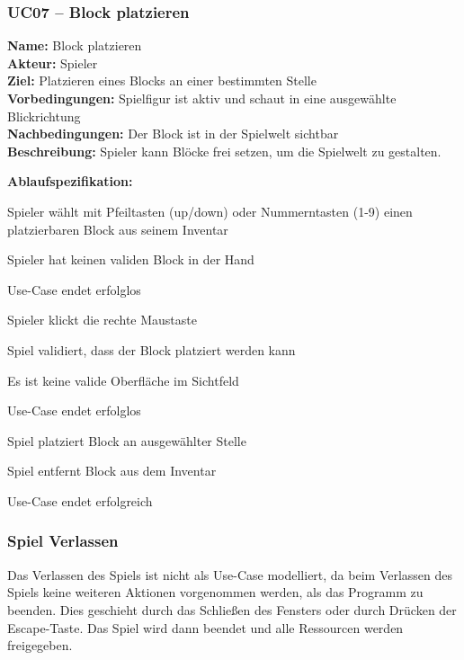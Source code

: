 \documentclass{article}
\begin{document}
\newpage

\subsubsection*{UC07 – Block platzieren}

\textbf{Name:} Block platzieren \\
\textbf{Akteur:} Spieler \\
\textbf{Ziel:} Platzieren eines Blocks an einer bestimmten Stelle \\
\textbf{Vorbedingungen:} Spielfigur ist aktiv und schaut in eine ausgewählte Blickrichtung \\
\textbf{Nachbedingungen:} Der Block ist in der Spielwelt sichtbar \\
\textbf{Beschreibung:} Spieler kann Blöcke frei setzen, um die Spielwelt zu gestalten.

\textbf{Ablaufspezifikation:}
\begin{description}[style=nextline,leftmargin=1.9cm,labelwidth=1.6cm]
  \item[1.] Spieler wählt mit Pfeiltasten (up/down) oder Nummerntasten (1-9) einen platzierbaren Block aus seinem Inventar
  \item[1a.] Spieler hat keinen validen Block in der Hand
  \item[1a.1.] Use-Case endet erfolglos
  \item[2.] Spieler klickt die rechte Maustaste
  \item[3.] Spiel validiert, dass der Block platziert werden kann
  \item[3a.] Es ist keine valide Oberfläche im Sichtfeld
  \item[3a.1.] Use-Case endet erfolglos
  \item[4.] Spiel platziert Block an ausgewählter Stelle
  \item[5.] Spiel entfernt Block aus dem Inventar
  \item[6.] Use-Case endet erfolgreich
\end{description}

\subsubsection*{Spiel Verlassen}

Das Verlassen des Spiels ist nicht als Use-Case modelliert, da beim Verlassen des Spiels keine weiteren Aktionen vorgenommen werden, als das Programm zu beenden. Dies geschieht durch das Schlie\ss{}en des Fensters oder durch Drücken der Escape-Taste. Das Spiel wird dann beendet und alle Ressourcen werden freigegeben.
\end{document}
